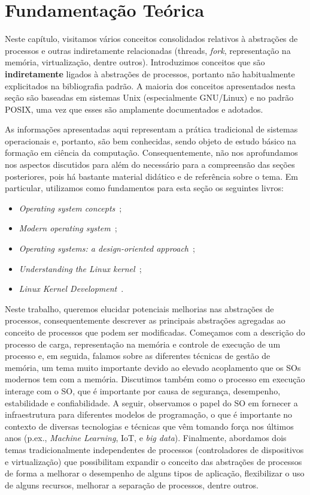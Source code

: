 \chapter{Fundamentação Teórica}
\label{cap:fundamentacao}

Neste capítulo, visitamos vários conceitos consolidados relativos à abstrações
de processos e outras indiretamente relacionadas (threads, \emph{fork},
representação na memória, virtualização, dentre outros). Introduzimos
conceitos que são \textbf{indiretamente} ligados à abstrações de processos,
portanto não habitualmente explicitados na bibliografia padrão. A maioria dos
conceitos apresentados nesta seção são baseadas em sistemas Unix (especialmente
GNU/Linux) e no padrão POSIX, uma vez que esses são amplamente documentados e
adotados.

As informações apresentadas aqui representam a prática tradicional de sistemas
operacionais e, portanto, são bem conhecidas, sendo objeto de estudo básico na
formação em ciência da computação. Consequentemente, não nos aprofundamos nos
aspectos discutidos para além do necessário para a compreensão das seções
posteriores, pois há bastante material didático e de referência sobre o tema.
Em particular, utilizamos como fundamentos para esta seção os seguintes livros:

\begin{itemize}
  \item \textit{Operating system concepts}~\citep{silberschatz};
  \item \textit{Modern operating system}~\citep{tanenbaum};
  \item \textit{Operating systems: a design-oriented approach}~\citep{crowley};
  \item \textit{Understanding the Linux kernel}~\citep{entendendo_kernel};
  \item \textit{Linux Kernel Development}~\citep{love}.
\end{itemize}

Neste trabalho, queremos elucidar potenciais melhorias nas abstrações de
processos, consequentemente descrever as principais abstrações agregadas ao
conceito de processos que podem ser modificadas. Começamos com a descrição do
processo de carga, representação na memória e controle de execução de um
processo e, em seguida, falamos sobre as diferentes técnicas de gestão de
memória, um tema muito importante devido ao elevado acoplamento que os SOs
modernos tem com a memória. Discutimos também como o processo em execução
interage com o SO, que é importante por causa de segurança, desempenho,
estabilidade e confiabilidade. A seguir, observamos o papel do SO em fornecer a
infraestrutura para diferentes modelos de programação, o que é importante no
contexto de diversas tecnologias e técnicas que vêm tomando força nos últimos
anos (p.ex., \emph{Machine Learning}, IoT, e \emph{big data}). Finalmente,
abordamos dois temas tradicionalmente independentes de processos (controladores
de dispositivos e virtualização) que possibilitam expandir o
conceito das abstrações de processos de forma a melhorar o desempenho de alguns
tipos de aplicação, flexibilizar o uso de alguns recursos, melhorar a separação
de processos, dentre outros.

